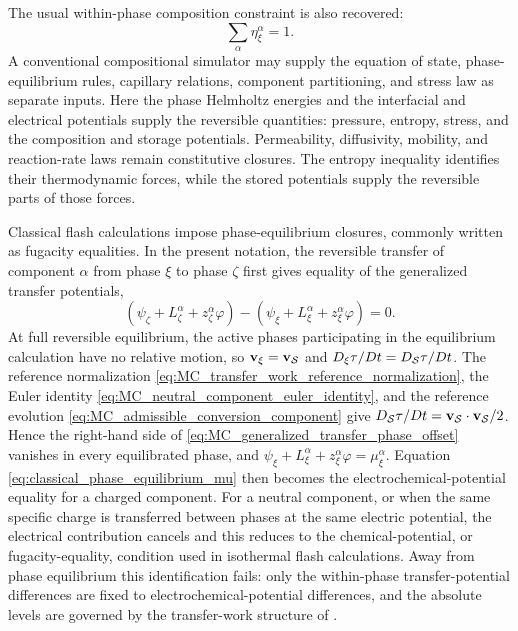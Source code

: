 The usual within-phase composition constraint is also recovered:
%
\begin{equation}
	\sum_\alpha\eta_\xi^\alpha=1 .
	\label{eq:classical_composition_constraints}
\end{equation}
%
A conventional compositional simulator may supply the equation of state,
phase-equilibrium rules, capillary relations, component partitioning, and
stress law as separate inputs.  Here the phase Helmholtz energies and the
interfacial and electrical potentials supply the reversible quantities:
pressure, entropy, stress, and the composition and storage potentials.
Permeability, diffusivity, mobility, and reaction-rate laws remain constitutive
closures.  The entropy inequality identifies their thermodynamic forces, while
the stored potentials supply the reversible parts of those forces.

Classical flash calculations impose phase-equilibrium closures, commonly written
as fugacity equalities.  In the present notation, the reversible transfer of
component $\alpha$ from phase $\xi$ to phase $\zeta$ first gives equality of
the generalized transfer potentials,
%
\begin{equation}
	\left(
	\psi_\zeta+L_\zeta^\alpha+z_\zeta^\alpha\varphi
	\right)
	-
	\left(
	\psi_\xi+L_\xi^\alpha+z_\xi^\alpha\varphi
	\right)
	=0 .
	\label{eq:classical_phase_equilibrium_mu}
\end{equation}
%
At full reversible equilibrium, the active phases participating in the
equilibrium calculation have no relative motion, so
\(\mathbf{v}_\xi=\mathbf{v}_{\mathcal{S}}\) and
\(D_\xi\tau/Dt=D_{\mathcal{S}}\tau/Dt\).  The reference normalization
\eqref{eq:MC_transfer_work_reference_normalization}, the Euler identity
\eqref{eq:MC_neutral_component_euler_identity}, and the reference evolution
\eqref{eq:MC_admissible_conversion_component} give
\(D_{\mathcal{S}}\tau/Dt
=\mathbf{v}_{\mathcal{S}}\cdot\mathbf{v}_{\mathcal{S}}/2\).  Hence the right-hand side of
\eqref{eq:MC_generalized_transfer_phase_offset} vanishes in every equilibrated
phase, and
\(\psi_\xi+L_\xi^\alpha+z_\xi^\alpha\varphi=\mu_\xi^\alpha\).
Equation \eqref{eq:classical_phase_equilibrium_mu} then becomes the
electrochemical-potential equality for a charged component.  For a neutral
component, or when the same specific charge is transferred between phases at
the same electric potential, the electrical contribution cancels and this
reduces to the chemical-potential, or fugacity-equality, condition used in
isothermal flash calculations.  Away from phase equilibrium this
identification fails: only the within-phase transfer-potential differences
are fixed to electrochemical-potential differences, and the absolute levels
are governed by the transfer-work structure of
.

